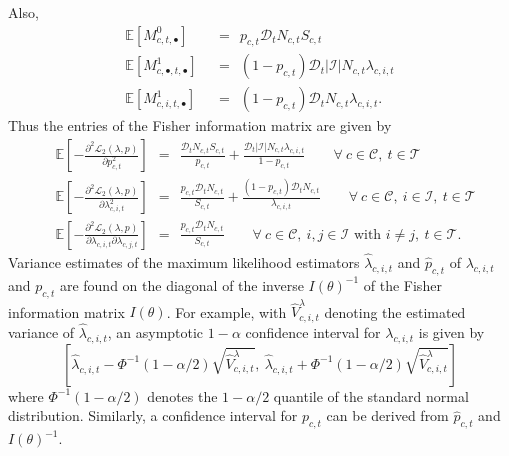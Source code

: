 Also,
\begin{align*}
\mathbb{E}[M_{c,t,\bullet}^{0}] \ \ & = \ \ p_{c,t}\mathcal{D}_{t} N_{c,t}S_{c,t} \\
\mathbb{E}[M_{c,\bullet,t,\bullet}^{1}] \ \ & = \ \ (1-p_{c,t})\mathcal{D}_{t} |\mathcal{I}|N_{c,t}\lambda_{c,i,t} \\
\mathbb{E}[M_{c,i,t,\bullet}^{1}] \ \ & = \ \ (1-p_{c,t})\mathcal{D}_{t} N_{c,t}\lambda_{c,i,t}.
\end{align*}
Thus the entries of the Fisher information matrix are given by
\begin{align*}
& \mathbb{E}\left[-\frac{\partial^2 \mathscr{L}_{2}(\lambda,p)}{\partial p_{c,t}^2}\right] \ \ = \ \ \frac{\mathcal{D}_{t} N_{c,t} S_{c,t}}{p_{c,t}} + \frac{\mathcal{D}_{t} |\mathcal{I}| N_{c,t} \lambda_{c,i,t}}{1-p_{c,t}} \qquad \forall \ c \in \mathcal{C}, \ t \in \mathcal{T} \\
& \mathbb{E}\left[-\frac{\partial^2 \mathscr{L}_{2}(\lambda,p)}{\partial \lambda_{c,i,t}^2}\right] \ \ = \ \ \frac{p_{c,t} \mathcal{D}_{t} N_{c,t}}{S_{c,t}} + \frac{(1-p_{c,t}) \mathcal{D}_{t} N_{c,t}}{ \lambda_{c,i,t}} \qquad \forall \ c \in \mathcal{C}, \ i \in \mathcal{I}, \ t \in \mathcal{T}\\
& \mathbb{E}\left[-\frac{\partial^2 \mathscr{L}_{2}(\lambda,p)}{\partial \lambda_{c,i,t} \partial \lambda_{c,j,t}}\right] \ \ = \ \ \frac{p_{c,t}\mathcal{D}_{t} N_{c,t}}{S_{c,t}} \qquad \forall \ c \in \mathcal{C}, \ i, j \in \mathcal{I} \mbox{ with } i \neq j, \ t \in \mathcal{T}.
\end{align*}
Variance estimates of the maximum likelihood estimators $\hat{\lambda}_{c,i,t}$ and $\hat{p}_{c,t}$ of $\lambda_{c,i,t}$ and $p_{c,t}$ are found on the diagonal of the inverse $I(\theta)^{-1}$ of the Fisher information matrix $I(\theta)$.
For example, with $\hat{V}^{\lambda}_{c,i,t}$ denoting the estimated variance of $\hat{\lambda}_{c,i,t}$, an asymptotic $1-\alpha$ confidence interval for $\lambda_{c,i,t}$ is given by
$$
\left[\hat{\lambda}_{c,i,t} - \Phi^{-1}(1-\alpha/2) \sqrt{\hat{V}^{\lambda}_{c,i,t}}, \ \hat{\lambda}_{c,i,t} + \Phi^{-1}(1-\alpha/2) \sqrt{\hat{V}^{\lambda}_{c,i,t}}\right]
$$
where $\Phi^{-1}(1-\alpha/2)$ denotes the $1-\alpha/2$ quantile of the standard normal distribution.
Similarly, a confidence interval for $p_{c,t}$ can be derived from $\hat{p}_{c,t}$ and $I(\theta)^{-1}$.
